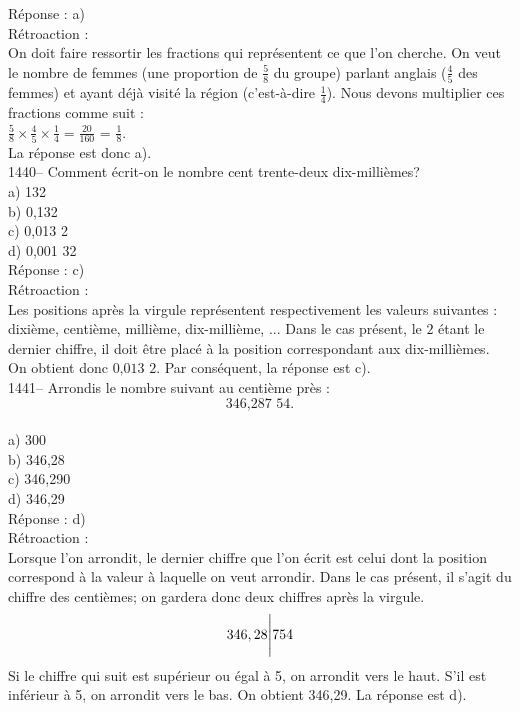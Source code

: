 R\'eponse : a)\\

R\'etroaction :\\
On doit faire ressortir les fractions qui repr\'esentent ce que l'on
cherche. On veut le nombre de femmes (une proportion de
$\frac{5}{8}$ du groupe) parlant anglais ($\frac{4}{5}$ des femmes)
et ayant d\'ej\`a visit\'e la r\'egion (c'est-\`a-dire
$\frac{1}{4}$). Nous devons multiplier ces fractions comme suit :\\[3mm]
$\frac{5}{8}\times\frac{4}{5}\times\frac{1}{4} = \frac{20}{160}$ =
$\frac{1}{8}$.\\[3mm] La r\'eponse est donc a).\\


1440-- Comment \'ecrit-on le nombre cent trente-deux dix-milli\`emes?\\
a) 132\\
b) 0,132\\
c) 0,013 2\\
d) 0,001 32\\

R\'eponse : c)\\

R\'etroaction :\\
Les positions apr\`es la virgule repr\'esentent respectivement les
valeurs suivantes : dixi\`eme, centi\`eme, milli\`eme,
dix-milli\`eme, ... Dans le cas pr\'esent, le $2$ \'etant le dernier
chiffre, il doit \^etre plac\'e \`a la position correspondant aux
dix-milli\`emes. On obtient donc
${\textrm{0,013 2}}$. Par cons\'equent, la r\'eponse est c).\\

1441-- Arrondis le nombre suivant au centi\`eme pr\`es : $${\textrm{346,287
54.}}$$\\
a) 300\\
b) 346,28\\
c) 346,290\\
d) 346,29\\

R\'eponse : d)\\

R\'etroaction :\\
Lorsque l'on arrondit, le dernier chiffre que l'on \'ecrit est celui
dont la position correspond \`a la valeur \`a laquelle on veut
arrondir. Dans le cas pr\'esent, il s'agit du chiffre des
centi\`emes; on gardera donc deux chiffres apr\`es la virgule.
$$346,28{\Bigg{\vert}}754$$ Si le chiffre qui suit est sup\'erieur
ou \'egal \`a 5, on arrondit vers le haut. S'il est inf\'erieur \`a 5, on
arrondit vers le bas. On obtient 346,29. La r\'eponse est d).\\

